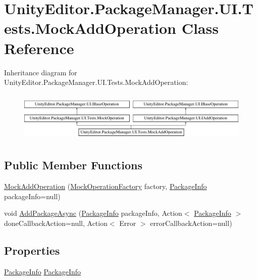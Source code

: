 \hypertarget{class_unity_editor_1_1_package_manager_1_1_u_i_1_1_tests_1_1_mock_add_operation}{}\section{Unity\+Editor.\+Package\+Manager.\+U\+I.\+Tests.\+Mock\+Add\+Operation Class Reference}
\label{class_unity_editor_1_1_package_manager_1_1_u_i_1_1_tests_1_1_mock_add_operation}
Inheritance diagram for Unity\+Editor.\+Package\+Manager.\+U\+I.\+Tests.\+Mock\+Add\+Operation\+:\begin{figure}[H]
\begin{center}
\leavevmode
\includegraphics[height=2.420749cm]{class_unity_editor_1_1_package_manager_1_1_u_i_1_1_tests_1_1_mock_add_operation}
\end{center}
\end{figure}
\subsection*{Public Member Functions}
\begin{DoxyCompactItemize}
\item 
\mbox{\hyperlink{class_unity_editor_1_1_package_manager_1_1_u_i_1_1_tests_1_1_mock_add_operation_a4a34c3a1385aae59f5a420eff9bfa696}{Mock\+Add\+Operation}} (\mbox{\hyperlink{class_unity_editor_1_1_package_manager_1_1_u_i_1_1_tests_1_1_mock_operation_factory}{Mock\+Operation\+Factory}} factory, \mbox{\hyperlink{class_unity_editor_1_1_package_manager_1_1_u_i_1_1_package_info}{Package\+Info}} package\+Info=null)
\item 
void \mbox{\hyperlink{class_unity_editor_1_1_package_manager_1_1_u_i_1_1_tests_1_1_mock_add_operation_aab0d0a956f90a3496b0a5cba30cdd2b7}{Add\+Package\+Async}} (\mbox{\hyperlink{class_unity_editor_1_1_package_manager_1_1_u_i_1_1_package_info}{Package\+Info}} package\+Info, Action$<$ \mbox{\hyperlink{class_unity_editor_1_1_package_manager_1_1_u_i_1_1_package_info}{Package\+Info}} $>$ done\+Callback\+Action=null, Action$<$ Error $>$ error\+Callback\+Action=null)
\end{DoxyCompactItemize}
\subsection*{Properties}
\begin{DoxyCompactItemize}
\item 
\mbox{\hyperlink{class_unity_editor_1_1_package_manager_1_1_u_i_1_1_package_info}{Package\+Info}} \mbox{\hyperlink{class_unity_editor_1_1_package_manager_1_1_u_i_1_1_tests_1_1_mock_add_operation_af0ccee664ea462e6715d2ddc784f08e4}{Package\+Info}}
\end{DoxyCompactItemize}
